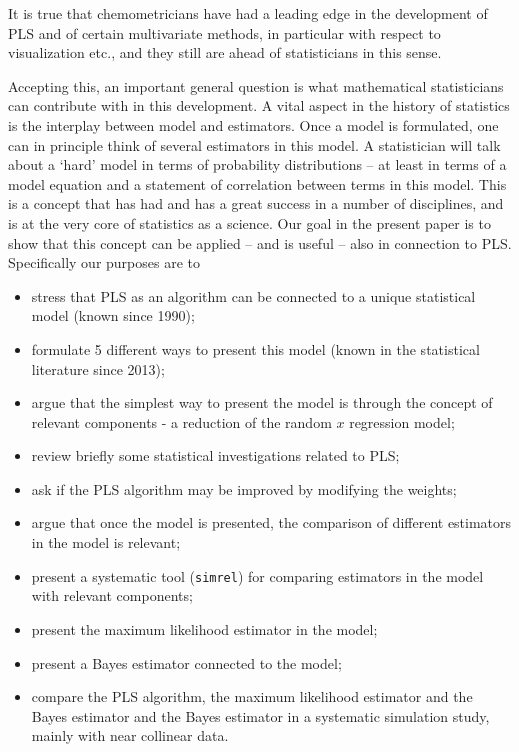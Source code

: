 \documentclass[num-refs]{wiley-article}
\begin{document}
It is true that chemometricians have had a leading edge in the development of PLS and of certain multivariate methods, in particular with respect to visualization etc., and they still are ahead of statisticians in this sense.

Accepting this, an important general question is what mathematical statisticians can contribute with in this development. A vital aspect in the history of statistics is the interplay between model and estimators. Once a model is formulated, one can in principle think of several estimators in this model. A statistician will talk about a `hard' model in terms of probability distributions -- at least in terms of a model equation and a statement of correlation between terms in this model. This is a concept that has had and has a great success in a number of disciplines, and is at the very core of statistics as a science. Our goal in the present paper is to show that this concept can be applied -- and is useful -- also in connection to PLS. Specifically our purposes are to

\begin{itemize}[label={--}]
\item stress that PLS as an algorithm can be connected to a unique statistical model (known since 1990);
\item formulate 5 different ways to present this model (known in the statistical literature since 2013);
\item argue that the simplest way to present the model is through the concept of relevant components - a reduction of the random $x$ regression model;
\item review briefly some statistical investigations related to PLS;
\item ask if the PLS algorithm may be improved by modifying the weights;
\item argue that once the model is presented, the comparison of different estimators in the model is relevant;
\item present a systematic tool ({\tt simrel}) for comparing estimators in the model with relevant components;
\item present the maximum likelihood estimator in the model;
\item present a Bayes estimator connected to the model;
\item compare the PLS algorithm, the maximum likelihood estimator and the Bayes estimator and the Bayes estimator in a systematic simulation study, mainly with near collinear data.
\end{itemize}
\end{document}
